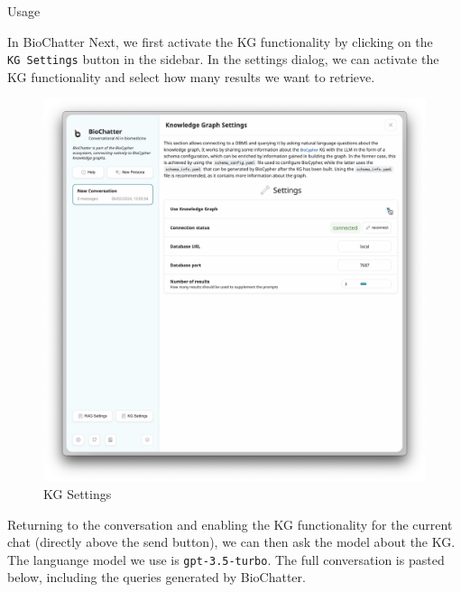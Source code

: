 Usage

In BioChatter Next, we first activate the KG functionality by clicking on the
\texttt{KG\ Settings} button in the sidebar. In the settings dialog, we can activate the
KG functionality and select how many results we want to retrieve.

\begin{fignos:no-prefix-figure-caption}

\begin{figure}
\centering
\includegraphics{images/kg-settings.png}
\caption{KG Settings}
\end{figure}

\end{fignos:no-prefix-figure-caption}

Returning to the conversation and enabling the KG functionality for the current
chat (directly above the send button), we can then ask the model about the KG.
The languange model we use is \texttt{gpt-3.5-turbo}. The full conversation is pasted
below, including the queries generated by BioChatter.


